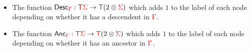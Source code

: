 \bigskip
\noindent\begin{example}
~\\\begin{itemize}
\item The function $\mathsf{Desc}_{\color{red}{\Gamma}}: {\color{red}{\mathsf T}} {\color{red}{\Sigma}} \to {\color{red}{\mathsf T}} (2\otimes{\color{red}{\Sigma}})$ which 
adds $1$ to the label of each node depending on whether it has a descendent in ${\color{red}{\Gamma}}$.
\item The function $\mathsf{Anc}_{\color{red}{\Gamma}}: {\color{red}{\mathsf T}} {\color{red}{\Sigma}} \to {\color{red}{\mathsf T}} (2\otimes{\color{red}{\Sigma}})$ which 
adds $1$ to the label of each node depending on whether it has an ancestor in ${\color{red}{\Gamma}}$.
\end{itemize}
\end{example}

